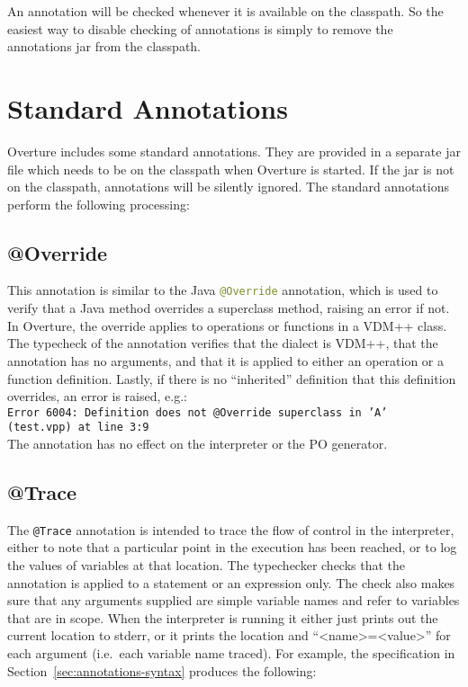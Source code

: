 An annotation will be checked whenever it is available on the
classpath. So the easiest way to disable checking of annotations is
simply to remove the annotations jar from the classpath.

\section{Standard Annotations}\label{sec:standard-annotations}

Overture includes some standard annotations. They are provided in a
separate jar file which needs to be on the classpath when Overture is
started. If the jar is not on the classpath, annotations will be
silently ignored. The standard annotations perform the following
processing:

\subsection{@Override}

This annotation is similar to the Java
\lstinline[language=Java]|@Override| annotation, which is used to
verify that a Java method overrides a superclass method, raising an
error if not. In Overture, the override applies to operations or
functions in a VDM++ class. The typecheck of the annotation verifies
that the dialect is VDM++, that the annotation has no arguments, and
that it is applied to either an operation or a function
definition. Lastly, if there is no ``inherited'' definition that this
definition overrides, an error is
raised, e.g.:\\

\noindent \texttt{Error 6004: Definition does not @Override superclass
  in 'A'\\ (test.vpp) at line 3:9}\\

\noindent The annotation has no effect on the interpreter or the PO
generator.

\subsection{@Trace}

The \lstinline[language=VDM++]|@Trace| annotation is intended to trace
the flow of control in the interpreter, either to note that a
particular point in the execution has been reached, or to log the
values of variables at that location. The typechecker checks that the
annotation is applied to a statement or an expression only. The check
also makes sure that any arguments supplied are simple variable names
and refer to variables that are in scope. When the interpreter is
running it either just prints out the current location to stderr, or
it prints the location and
``\textless{}name{}\textgreater{}={}\textless{}value{}\textgreater''
for each argument (i.e.\ each variable name traced). For example, the
specification in Section~\ref{sec:annotations-syntax} produces the
following:

